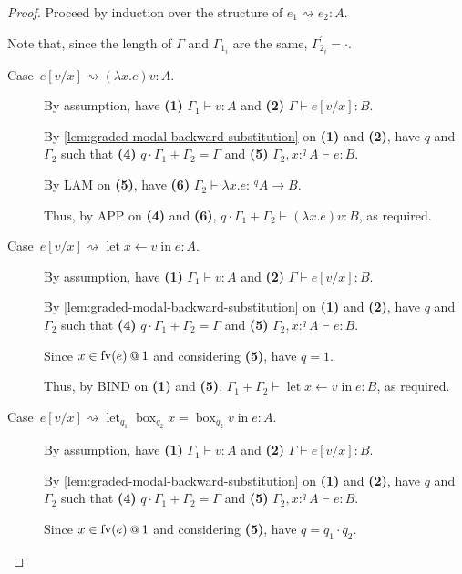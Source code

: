 \documentclass[acmsmall,screen,nonacm]{acmart}
\makeatletter
\DeclareMathOperator{\llet}{\text{let}}
\DeclareMathOperator{\lin}{\text{in}}
\DeclareMathOperator{\bbox}{\text{box}}
\newcommand{\at}{\mathbin{\mbox{\small\ensuremath{@}}}}
\newcommand{\tee}{\vdash}
\DeclareMathOperator{\red}{\rightsquigarrow}
\makeatother
\begin{document}
\begin{proof}
  Proceed by induction over the structure of $e_1 \red e_2 : A$. 
  
  Note that, since the length of $\Gamma$ and $\Gamma_{1_i}$ are the same, $\Gamma_{2_i}^\prime = \cdot.$
  \begin{description}
    \item[\mbox{Case $e[v/x] \red (\lambda x.e) v : A$}.]
    By assumption, have \textbf{(1)} $\Gamma_1 \tee v : A$ and \textbf{(2)} $\Gamma \tee e[v/x] : B$.

    By \ref{lem:graded-modal-backward-substitution} on \textbf{(1)} and \textbf{(2)}, have $q$ and $\Gamma_2$ such that \textbf{(4)} $q \cdot \Gamma_1 + \Gamma_2 = \Gamma$ and \textbf{(5)} $\Gamma_2, x :^q A \tee e : B$.

    By LAM on \textbf{(5)}, have \textbf{(6)} $\Gamma_2 \tee \lambda x.e : \,^q A \rightarrow B$.

    Thus, by APP on \textbf{(4)} and \textbf{(6)}, $q \cdot \Gamma_1 + \Gamma_2 \tee (\lambda x.e) v : B$, as required.
    \\
    \item[\mbox{Case $e[v/x] \red \llet x \leftarrow v \lin e : A$}.]
    By assumption, have \textbf{(1)} $\Gamma_1 \tee v : A$ and \textbf{(2)} $\Gamma \tee e[v/x] : B$.
    
    By \ref{lem:graded-modal-backward-substitution} on \textbf{(1)} and \textbf{(2)}, have $q$ and $\Gamma_2$ such that \textbf{(4)} $q \cdot \Gamma_1 + \Gamma_2 = \Gamma$ and \textbf{(5)} $\Gamma_2, x :^q A \tee e : B$.

    Since $x \in \mathrm{fv}(e) \at 1$ and considering \textbf{(5)}, have $q = 1$.

    Thus, by BIND on \textbf{(1)} and \textbf{(5)}, $\Gamma_1 + \Gamma_2 \tee \llet x \leftarrow v \lin e : B$, as required.
    \\
    \item[\mbox{Case $e[v/x] \red \llet_{q_1} \bbox_{q_2} x = \bbox_{q_2} v \lin e : A$}.]
    By assumption, have \textbf{(1)} $\Gamma_1 \tee v : A$ and \textbf{(2)} $\Gamma \tee e[v/x] : B$.

    By \ref{lem:graded-modal-backward-substitution} on \textbf{(1)} and \textbf{(2)}, have $q$ and $\Gamma_2$ such that \textbf{(4)} $q \cdot \Gamma_1 + \Gamma_2 = \Gamma$ and \textbf{(5)} $\Gamma_2, x :^q A \tee e : B$.

    Since $x \in \mathrm{fv}(e) \at 1$ and considering \textbf{(5)}, have $q = q_1 \cdot q_2$.


\end{description}
\end{proof}
\end{document}
